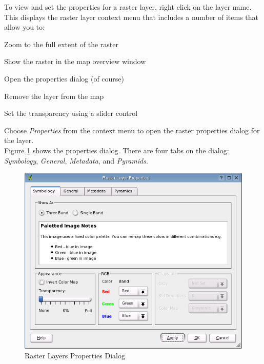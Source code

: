 \documentclass[10pt,english]{article}
\begin{document}
\begin{onehalfspace}
To view and set the properties for a raster layer, right click on the layer name. This displays the raster layer context menu that includes a number of items that allow you to:
\begin{compactitem}
\item Zoom to the full extent of the raster
\item Show the raster in the map overview window
\item Open the properties dialog (of course)
\item Remove the layer from the map
\item Set the transparency using a slider control
\end{compactitem}
Choose \textsl{Properties} from the context menu to open the raster properties dialog for the layer.\\


Figure \ref{fig:raster_properties} shows the properties dialog. There are four tabs on the dialog: \textsl{Symbology}, \textsl{General}, \textsl{Metadata}, and \textsl{Pyramids}.

\begin{figure}[h]
   \begin{center}
   \caption{Raster Layers Properties Dialog}\label{fig:raster_properties}\smallskip
   \includegraphics[scale=.7]{qgis_user_guide_images/raster_properties}
\end{center}  
\end{figure}



\end{onehalfspace}
\end{document}
